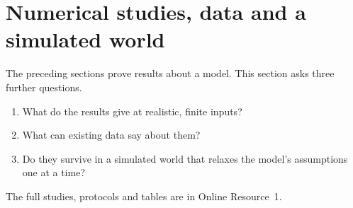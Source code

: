 \section{Numerical studies, data and a simulated world}\label{sec:num}

The preceding sections prove results about a model. This section asks three further questions.
\begin{enumerate}
\item What do the results give at realistic, finite inputs?
\item What can existing data say about them?
\item Do they survive in a simulated world that relaxes the model's assumptions one at a time?
\end{enumerate}
The full studies, protocols and tables are in Online Resource~1.




